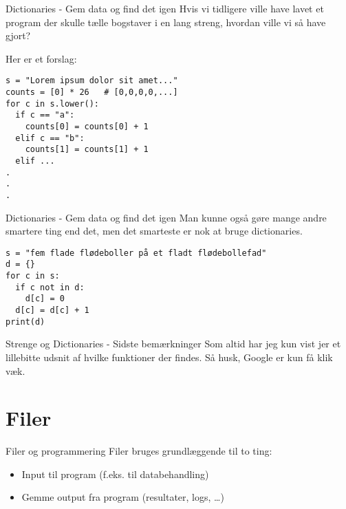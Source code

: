 \begin{frame}[fragile]{Dictionaries - Gem data og find det igen}
	Hvis vi tidligere ville have lavet et program der skulle tælle bogstaver i en lang streng, hvordan ville vi så have gjort?
	\pause
	
	Her er et forslag:
	\begin{lstlisting}[style=python]
s = "Lorem ipsum dolor sit amet..."
counts = [0] * 26	# [0,0,0,0,...]
for c in s.lower():
  if c == "a":
    counts[0] = counts[0] + 1
  elif c == "b":
    counts[1] = counts[1] + 1
  elif ...
.
.
.
	\end{lstlisting}
\end{frame}


\begin{frame}[fragile]{Dictionaries - Gem data og find det igen}
	Man kunne også gøre mange andre smartere ting end det, men det smarteste er nok at bruge dictionaries.
	\pause
	\begin{lstlisting}[style=python]
s = "fem flade flødeboller på et fladt flødebollefad"
d = {}
for c in s:
  if c not in d:
    d[c] = 0
  d[c] = d[c] + 1
print(d)
	\end{lstlisting}
\end{frame}

\begin{frame}[fragile]{Strenge og Dictionaries - Sidste bemærkninger}
	Som altid har jeg kun vist jer et lillebitte udsnit af hvilke funktioner der findes. Så husk, Google er kun få klik væk.
\end{frame}




\section{Filer}

\begin{frame}{Filer og programmering}
	Filer bruges grundlæggende til to ting:
	\begin{itemize}
		\item Input til program (f.eks. til databehandling)
		\item Gemme output fra program (resultater, logs, \ldots)
	\end{itemize}
\end{frame}

